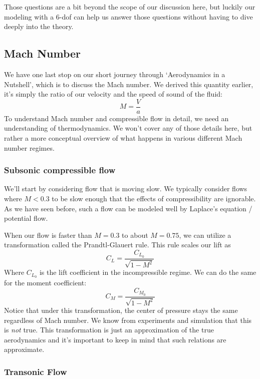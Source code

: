 \documentclass[10pt, openany, titlepage]{book}
\theoremstyle{definition}
\begin{document}
Those questions are a bit beyond the scope of our discussion here, but luckily our modeling with a 6-\gls{dof} can help us answer those questions without having to dive deeply into the theory.

\subsection{Mach Number}

We have one last stop on our short journey through `Aerodynamics in a Nutshell', which is to discuss the Mach number. We derived this quantity earlier, it's simply the ratio of our velocity and the speed of sound of the fluid:
$$M=\frac{V}{a}$$
To understand Mach number and compressible flow in detail, we need an understanding of thermodynamics. We won't cover any of those details here, but rather a more conceptual overview of what happens in various different Mach number regimes.

\subsubsection{Subsonic compressible flow}

We'll start by considering flow that is moving slow. We typically consider flows where $M<0.3$ to be slow enough that the effects of compressibility are ignorable. As we have seen before, such a flow can be modeled well by Laplace's equation / potential flow.

When our flow is faster than $M=0.3$ to about $M=0.75$, we can utilize a transformation called the Prandtl-Glauert rule. This rule scales our lift as
$$C_L=\frac{C_{L_0}}{\sqrt{1-M^2}}$$
Where $C_{L_0}$ is the lift coefficient in the incompressible regime. We can do the same for the moment coefficient:
$$C_M=\frac{C_{M_0}}{\sqrt{1-M^2}}$$
Notice that under this transformation, the center of pressure stays the same regardless of Mach number. We know from experiments and simulation that this is \textit{not} true.  This transformation is just an approximation of the true aerodynamics and it's important to keep in mind that such relations are approximate.

\subsubsection{Transonic Flow}
\end{document}
